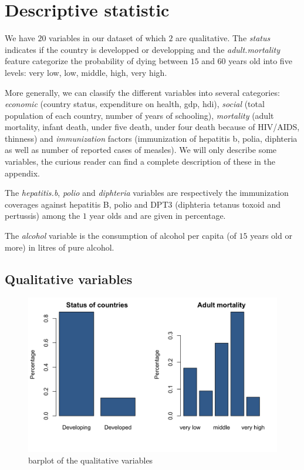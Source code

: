 \section{Descriptive statistic}

We have $20$ variables in our dataset of which $2$ are qualitative. The \textit{status} indicates if the country is developped or developping and the \textit{adult.mortality} feature categorize the probability of dying between $15$ and $60$ years old into five levels: very low, low, middle, high, very high. 

More generally, we can classify the different variables into several categories: \textit{economic} (country status, expenditure on health, gdp, hdi), \textit{social} (total population of each country, number of years of schooling), \textit{mortality} (adult mortality, infant death, under five death, under four death because of HIV/AIDS, thinness) and \textit{immunization} factors (immunization of hepatitis b, polia, diphteria as well as number of reported cases of measles). We will only describe some variables, the curious reader can find a complete description of these in the appendix.

The \textit{hepatitis.b}, \textit{polio} and \textit{diphteria} variables are respectively the immunization coverages against hepatitis B, polio and DPT3 (diphteria tetanus toxoid and pertussis) among the $1$ year olds and are given in percentage.

The \textit{alcohol} variable is the consumption of alcohol per capita (of $15$ years old or more) in litres of pure alcohol.

\subsection{Qualitative variables}

\begin{figure}[H]
	\centering
	\includegraphics{figures/qualitative_variables_plot.png}
	\caption{barplot of the qualitative variables}
	\label{fig:qualitative_variables_barplot}
\end{figure}

